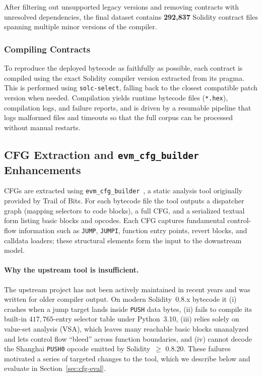 \documentclass{article}
\begin{document}
After filtering out unsupported legacy versions and removing contracts with
unresolved dependencies, the final dataset contains \textbf{292{,}837} Solidity
contract files spanning multiple minor versions of the compiler.

\subsubsection{Compiling Contracts}

To reproduce the deployed bytecode as faithfully as possible, each contract is
compiled using the exact Solidity compiler version extracted from its pragma. This
is performed using \texttt{solc-select}, falling back to the closest compatible
patch version when needed. Compilation yields runtime bytecode files
(\texttt{*.hex}), compilation logs, and failure reports, and is driven by a
resumable pipeline that logs malformed files and timeouts so that the full corpus
can be processed without manual restarts.

\subsection{CFG Extraction and \texttt{evm\_cfg\_builder} Enhancements}
\label{sec:cfg-extract}

CFGs are extracted using \texttt{evm\_cfg\_builder}~\cite{evm_cfg_builder}, a
static analysis tool originally provided by Trail of Bits. For each bytecode file
the tool outputs a dispatcher graph (mapping selectors to code blocks), a full CFG,
and a serialized textual form listing basic blocks and opcodes. Each CFG captures
fundamental control-flow information such as \texttt{JUMP}, \texttt{JUMPI},
function entry points, revert blocks, and calldata loaders; these structural
elements form the input to the downstream model.

\paragraph{Why the upstream tool is insufficient.}
The upstream project has not been actively maintained in recent years and was
written for older compiler output. On modern Solidity~0.8.x bytecode it (i)
crashes when a jump target lands inside \texttt{PUSH} data bytes, (ii) fails to
compile its built-in $417{,}765$-entry selector table under Python~3.10, (iii)
relies solely on value-set analysis (VSA), which leaves many reachable basic
blocks unanalyzed and lets control flow ``bleed'' across function boundaries, and
(iv) cannot decode the Shanghai \texttt{PUSH0} opcode emitted by Solidity~$\geq$
0.8.20. These failures motivated a series of targeted changes to the tool, which
we describe below and evaluate in Section~\ref{sec:cfg-eval}.
\end{document}
